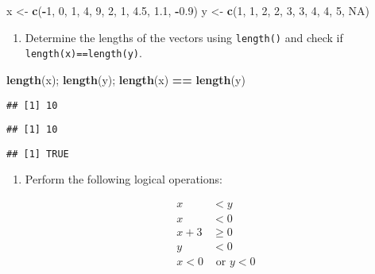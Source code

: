 \documentclass[]{article}
\newenvironment{Shaded}{\begin{snugshade}}{\end{snugshade}}
\newcommand{\KeywordTok}[1]{\textcolor[rgb]{0.13,0.29,0.53}{\textbf{#1}}}
\newcommand{\DecValTok}[1]{\textcolor[rgb]{0.00,0.00,0.81}{#1}}
\newcommand{\FloatTok}[1]{\textcolor[rgb]{0.00,0.00,0.81}{#1}}
\newcommand{\StringTok}[1]{\textcolor[rgb]{0.31,0.60,0.02}{#1}}
\newcommand{\OtherTok}[1]{\textcolor[rgb]{0.56,0.35,0.01}{#1}}
\newcommand{\OperatorTok}[1]{\textcolor[rgb]{0.81,0.36,0.00}{\textbf{#1}}}
\newcommand{\NormalTok}[1]{#1}
\providecommand{\tightlist}{%
  \setlength{\itemsep}{0pt}\setlength{\parskip}{0pt}}
\begin{document}
\begin{Shaded}
\begin{Highlighting}[]
\NormalTok{x <-}\StringTok{ }\KeywordTok{c}\NormalTok{(}\OperatorTok{-}\DecValTok{1}\NormalTok{, }\DecValTok{0}\NormalTok{, }\DecValTok{1}\NormalTok{, }\DecValTok{4}\NormalTok{, }\DecValTok{9}\NormalTok{, }\DecValTok{2}\NormalTok{, }\DecValTok{1}\NormalTok{, }\FloatTok{4.5}\NormalTok{, }\FloatTok{1.1}\NormalTok{, }\OperatorTok{-}\FloatTok{0.9}\NormalTok{)}
\NormalTok{y <-}\StringTok{ }\KeywordTok{c}\NormalTok{(}\DecValTok{1}\NormalTok{, }\DecValTok{1}\NormalTok{, }\DecValTok{2}\NormalTok{, }\DecValTok{2}\NormalTok{, }\DecValTok{3}\NormalTok{, }\DecValTok{3}\NormalTok{, }\DecValTok{4}\NormalTok{, }\DecValTok{4}\NormalTok{, }\DecValTok{5}\NormalTok{, }\OtherTok{NA}\NormalTok{)}
\end{Highlighting}
\end{Shaded}

\begin{enumerate}
\def\labelenumi{\arabic{enumi}.}
\setcounter{enumi}{1}
\tightlist
\item
  Determine the lengths of the vectors using \texttt{length()} and check
  if \texttt{length(x)==length(y)}.
\end{enumerate}

\begin{Shaded}
\begin{Highlighting}[]
\KeywordTok{length}\NormalTok{(x); }\KeywordTok{length}\NormalTok{(y); }\KeywordTok{length}\NormalTok{(x) }\OperatorTok{==}\StringTok{ }\KeywordTok{length}\NormalTok{(y)}
\end{Highlighting}
\end{Shaded}

\begin{verbatim}
## [1] 10
\end{verbatim}

\begin{verbatim}
## [1] 10
\end{verbatim}

\begin{verbatim}
## [1] TRUE
\end{verbatim}

\begin{enumerate}
\def\labelenumi{\arabic{enumi}.}
\setcounter{enumi}{2}
\tightlist
\item
  Perform the following logical operations:

  \begin{align*}
  x &<y \\
  x &<0 \\
  x+3 &\geq 0 \\
  y &<0 \\
  x<0 &\text{ or }y<0
  \end{align*}
\end{enumerate}
\end{document}
